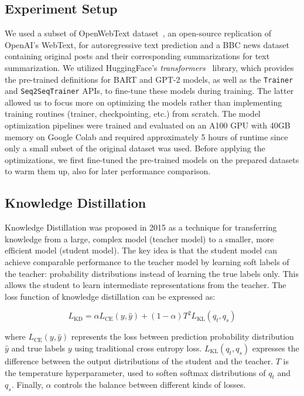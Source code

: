 \subsection{Experiment Setup}
We used a subset of OpenWebText dataset~\cite{gokaslan2019openwebtext}, an open-source replication of OpenAI's WebText,
for autoregressive text prediction and a BBC news dataset containing original posts and their corresponding summarizations for text summarization.
We utilized HuggingFace's \textit{transformers}~\cite{wolf2020transformers} library,
which provides the pre-trained definitions for BART and GPT-2 models, as well as the \texttt{Trainer} and \texttt{Seq2SeqTrainer} APIs,
to fine-tune these models during training.
The latter allowed us to focus more on optimizing the models rather than implementing training routines (trainer, checkpointing, etc.) from scratch.
The model optimization pipelines were trained and evaluated on an A100 GPU with 40GB memory on Google Colab
and required approximately 5 hours of runtime since only a small subset of the original dataset was used.
Before applying the optimizations, we first fine-tuned the pre-trained models on the prepared datasets to warm them up,
also for later performance comparison.

\subsection{Knowledge Distillation}
Knowledge Distillation was proposed in 2015 as a technique for transferring knowledge from a large, complex model (teacher model) to a smaller,
more efficient model (student model).
The key idea is that the student model can achieve comparable performance to the teacher model by learning soft labels of the teacher:
probability distributions instead of learning the true labels only.
This allows the student to learn intermediate representations from the teacher.
The loss function of knowledge distillation can be expressed as:

\begin{equation}
    L_{\text{KD}} = \alpha L_{\text{CE}}(y, \hat{y}) + (1 - \alpha) T^2 L_{\text{KL}}(q_t, q_s)
    \label{eq:kd-loss}
\end{equation}

where $L_{\text{CE}}(y, \hat{y})$ represents the loss between prediction probability distribution $\hat{y}$ and true labels $y$ using traditional cross entropy loss.
$L_{\text{KL}}(q_t, q_s)$ expresses the difference between the output distributions of the student and the teacher.
$T$ is the temperature hyperparameter, used to soften softmax distributions of $q_t$ and $q_s$.
Finally, $\alpha$ controls the balance between different kinds of losses.


